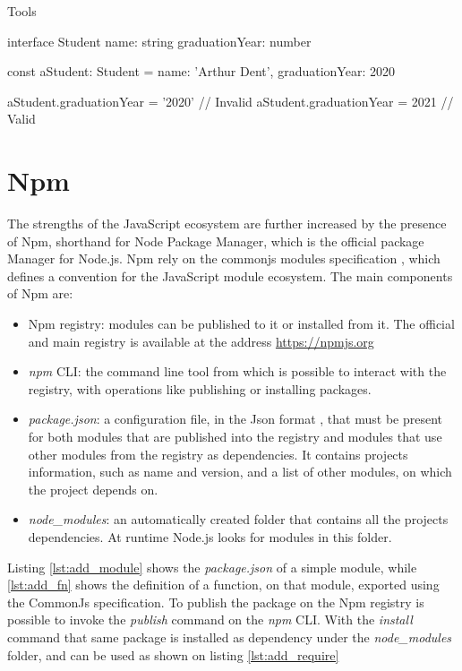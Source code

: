 \begin{chapter}{Tools}
    \bigskip
    \begin{code}[caption=Static type checking on Typescript, label={ts_static}]
interface Student {
  name: string
  graduationYear: number
}

const aStudent: Student = {
  name: 'Arthur Dent',
  graduationYear: 2020
}

aStudent.graduationYear = '2020'    // Invalid
aStudent.graduationYear = 2021      // Valid
    \end{code}

    \section{Npm}
    The strengths of the JavaScript ecosystem are further increased by the presence
    of Npm, shorthand for Node Package Manager, which is the official package Manager
    for Node.js. Npm rely on the commonjs modules specification \cite{common_js},
    which defines a convention for the JavaScript module ecosystem.
    The main components of Npm are:
    \begin{itemize}
        \item Npm registry: modules can be published to it or installed from it.
            The official and main registry is available at the address
            \url{https://npmjs.org}
        \item \textit{npm} CLI: the command line tool from which is possible to interact
            with the registry, with operations like publishing or installing packages.
        \item \textit{package.json}: a configuration file, in the Json format
            \cite{json_iso}, that must be present for both modules that are published
            into the registry and modules that use other modules from the registry
            as dependencies. It contains projects information, such as name and
            version, and a list of other modules, on which the project depends on.
        \item \textit{node\_modules}: an automatically created folder that contains
            all the projects dependencies. At runtime Node.js looks for modules
            in this folder.
    \end{itemize}

    Listing \ref{lst:add_module} shows the \textit{package.json} of a simple module,
    while \ref{lst:add_fn} shows the definition of a function, on that module,
    exported using the CommonJs specification. To publish the package on the Npm
    registry is possible to invoke the \textit{publish} command on the \textit{npm}
    CLI. With the \textit{install} command that same package is installed as
    dependency under the \textit{node\_modules} folder, and can be used as shown
    on listing \ref{lst:add_require}


\end{chapter}
